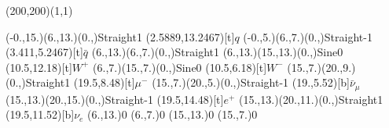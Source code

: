 \documentclass[12pt]{article}
\begin{document}
 
 \thispagestyle{empty}
	
 \begin{feynartspicture}(200,200)(1,1) 
 \FADiagram{} 
 
\FAProp(-0.,15.)(6.,13.)(0.,){Straight}{1}
\FALabel(2.5889,13.2467)[t]{$q$}
\FAProp(-0.,5.)(6.,7.)(0.,){Straight}{-1}
\FALabel(3.411,5.2467)[t]{$\bar{q}$}
\FAProp(6.,13.)(6.,7.)(0.,){Straight}{1}
\FAProp(6.,13.)(15.,13.)(0.,){Sine}{0}
\FALabel(10.5,12.18)[t]{$W^+$}
\FAProp(6.,7.)(15.,7.)(0.,){Sine}{0}
\FALabel(10.5,6.18)[t]{$W^-$}
\FAProp(15.,7.)(20.,9.)(0.,){Straight}{1}
\FALabel(19.5,8.48)[t]{$\mu^-$}
\FAProp(15.,7.)(20.,5.)(0.,){Straight}{-1}
\FALabel(19.,5.52)[b]{$\bar{\nu}_{\mu}$}
\FAProp(15.,13.)(20.,15.)(0.,){Straight}{-1}
\FALabel(19.5,14.48)[t]{$e^+$}
\FAProp(15.,13.)(20.,11.)(0.,){Straight}{1}
\FALabel(19.5,11.52)[b]{$\nu_e$}
\FAVert(6.,13.){0}
\FAVert(6.,7.){0}
\FAVert(15.,13.){0}
\FAVert(15.,7.){0}
	
 
 \end{feynartspicture} 
 
\end{document}
